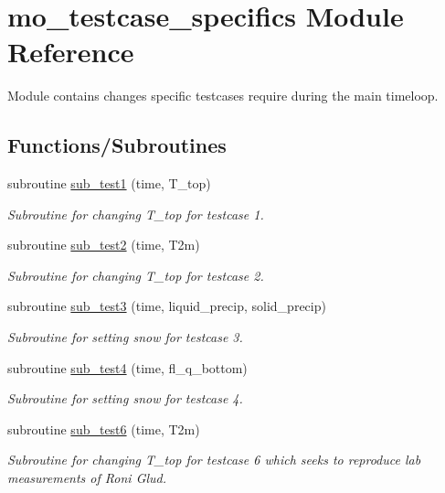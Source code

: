 \hypertarget{namespacemo__testcase__specifics}{
\section{mo\_\-testcase\_\-specifics Module Reference}
\label{namespacemo__testcase__specifics}
}


Module contains changes specific testcases require during the main timeloop.  


\subsection*{Functions/Subroutines}
\begin{DoxyCompactItemize}
\item 
subroutine \hyperlink{namespacemo__testcase__specifics_a86b57477e64f1d4072cbf54a96a4af59}{sub\_\-test1} (time, T\_\-top)
\begin{DoxyCompactList}\small\item\em Subroutine for changing T\_\-top for testcase 1. \item\end{DoxyCompactList}\item 
subroutine \hyperlink{namespacemo__testcase__specifics_a304d7bfb9ab386dafb7499298d987ab4}{sub\_\-test2} (time, T2m)
\begin{DoxyCompactList}\small\item\em Subroutine for changing T\_\-top for testcase 2. \item\end{DoxyCompactList}\item 
subroutine \hyperlink{namespacemo__testcase__specifics_aac3a50dbd4296f51264034abca3890ef}{sub\_\-test3} (time, liquid\_\-precip, solid\_\-precip)
\begin{DoxyCompactList}\small\item\em Subroutine for setting snow for testcase 3. \item\end{DoxyCompactList}\item 
subroutine \hyperlink{namespacemo__testcase__specifics_aed1ec369607b5f1bc51a1d93f8106e29}{sub\_\-test4} (time, fl\_\-q\_\-bottom)
\begin{DoxyCompactList}\small\item\em Subroutine for setting snow for testcase 4. \item\end{DoxyCompactList}\item 
subroutine \hyperlink{namespacemo__testcase__specifics_a935370b45b47663d79fa1621dbec15b9}{sub\_\-test6} (time, T2m)
\begin{DoxyCompactList}\small\item\em Subroutine for changing T\_\-top for testcase 6 which seeks to reproduce lab measurements of Roni Glud. \item\end{DoxyCompactList}\end{DoxyCompactItemize}


